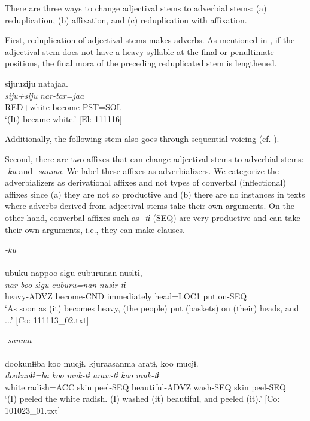 There are three ways to change adjectival stems to adverbial stems: (a) reduplication, (b) affixation, and (c) reduplication with affixation.

  First, reduplication of adjectival stems makes adverbs. As mentioned in , if the adjectival stem does not have a heavy syllable at the final or penultimate positions, the final mora of the preceding reduplicated stem is lengthened.

\ea   \label{ex:4.60}
\glll    sijuuziju  natajaa.\\
    \textit{siju+siju}  \textit{nar-tar=jaa}\\
    RED+white  become-PST=SOL\\
    \glt     ‘(It) became white.’ [El: 111116]
\z

Additionally, the following stem also goes through sequential voicing (cf. ).

Second, there are two affixes that can change adjectival stems to adverbial stems: \textit{{}-ku} and \textit{{}-sanma}. We label these affixes as adverbializers. We categorize the adverbializers as derivational affixes and not types of converbal (inflectional) affixes since (a) they are not so productive and (b) there are no instances in texts where adverbs derived from adjectival stems take their own arguments. On the other hand, converbal affixes such as \textit{{}-tɨ} (SEQ) are very productive and can take their own arguments, i.e., they can make clauses.

\ea  \label{ex:4.61} \ea  \textit{{}-ku} \label{ex:4.61a}\\\\
    \glll     ubuku  nappoo  sɨgu  cuburunan  nusɨtɨ,\\
      \textit{}  \textit{nar-boo}  \textit{sɨgu}  \textit{cuburu=nan}  \textit{nusɨr-tɨ}\\
      heavy-ADVZ  become-CND  immediately  head=LOC1  put.on-SEQ\\
      \glt       ‘As soon as (it) becomes heavy, (the people) put (baskets) on (their) heads, and ...’ [Co: 111113\_02.txt]

\ex  \textit{{}-sanma}\\\\
\glll dookunɨɨba  koo  mucjɨ.  kjuraasanma  aratɨ,   koo  mucjɨ.\\
      \textit{dookunɨɨ=ba}  \textit{koo}  \textit{muk-tɨ}  \textit{}  \textit{araw-tɨ}  \textit{koo}  \textit{muk-tɨ}\\                                                                                                  
      white.radish=ACC  skin  peel-SEQ  beautiful-ADVZ  wash-SEQ                                   skin  peel-SEQ\\
      \glt       ‘(I) peeled the white radish. (I) washed (it) beautiful, and peeled (it).’     [Co: 101023\_01.txt]
    \z
\z

